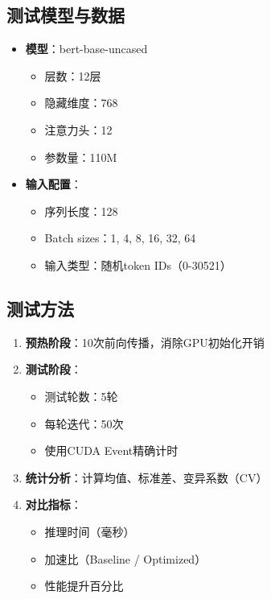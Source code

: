 \documentclass[12pt,a4paper]{article}
\begin{document}
\subsection{测试模型与数据}

\begin{itemize}
    \item \textbf{模型}：bert-base-uncased
    \begin{itemize}
        \item 层数：12层
        \item 隐藏维度：768
        \item 注意力头：12
        \item 参数量：110M
    \end{itemize}
    
    \item \textbf{输入配置}：
    \begin{itemize}
        \item 序列长度：128
        \item Batch sizes：1, 4, 8, 16, 32, 64
        \item 输入类型：随机token IDs（0-30521）
    \end{itemize}
\end{itemize}

\subsection{测试方法}

\begin{enumerate}
    \item \textbf{预热阶段}：10次前向传播，消除GPU初始化开销
    \item \textbf{测试阶段}：
    \begin{itemize}
        \item 测试轮数：5轮
        \item 每轮迭代：50次
        \item 使用CUDA Event精确计时
    \end{itemize}
    \item \textbf{统计分析}：计算均值、标准差、变异系数（CV）
    \item \textbf{对比指标}：
    \begin{itemize}
        \item 推理时间（毫秒）
        \item 加速比（Baseline / Optimized）
        \item 性能提升百分比
    \end{itemize}
\end{enumerate}
\end{document}
